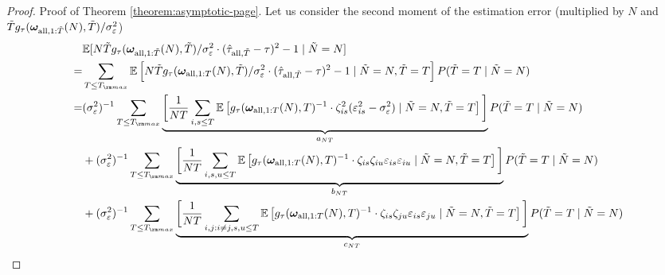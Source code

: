 \begin{proof}{Proof of Theorem \ref{theorem:asymptotic-page}.}
Let us consider the second moment of the estimation error (multiplied by $N$ and $\tilde{T}g_\tau(\bm{\omega}_{\mathrm{all},1:\tilde{T}}(N),\tilde{T})/\sigma_\varepsilon^2$)
\begin{align*}
     & \+E[N \tilde{T}\funfrac(\bm{\omega}_{\all,1:\tilde{T}}(N),\tilde{T})/\sigma_\varepsilon^2 \cdot (\hat{\tau}_{\all,\tilde{T}} - \tau)^2 - 1\mid \tilde{N}= N] \\
     =& \sum_{T \leq T_{\rm max}} \+E\left[ N \tilde{T}\funfrac(\bm{\omega}_{\all,1:T}(N),\tilde{T})/\sigma_\varepsilon^2 \cdot (\hat{\tau}_{\all,\tilde{T}} - \tau)^2  - 1\mid \tilde{N} = N, \tilde{T} = T \right] P(\tilde{T} = T \mid \tilde{N} = N)\\
     =& (\sigma_\varepsilon^2)^{-1} \sum_{T \leq T_{\rm max}} \underbrace{\bigg[ \frac{1}{NT}  \sum_{i,s \leq T} \+E\left[ \funfrac(\bm{\omega}_{\all,1:T}(N),{T})^\I \cdot \zeta_{is}^2 (\varepsilon_{is}^2 - \sigma_\varepsilon^2) \mid \tilde{N} = N, \tilde{T} = T \right] \bigg] }_{a_{NT}} P(\tilde{T} = T \mid \tilde{N} = N)\\
     & + (\sigma_\varepsilon^2)^{-1} \sum_{T \leq T_{\rm max}} \underbrace{\bigg[ \frac{1}{NT} \sum_{i,s,u\leq T} \+E\left[ \funfrac(\bm{\omega}_{\all,1:T}(N),{T})^\I \cdot \zeta_{is} \zeta_{iu}  \varepsilon_{is} \varepsilon_{iu} \mid \tilde{N} = N, \tilde{T} = T \right] \bigg] }_{b_{NT}} P(\tilde{T} = T \mid \tilde{N} = N)\\
     & + (\sigma_\varepsilon^2)^{-1} \sum_{T \leq T_{\rm max}} \underbrace{\bigg[ \frac{1}{NT} \sum_{i,j: i \neq j,s,u\leq T} \+E\left[ \funfrac(\bm{\omega}_{\all,1:T}(N),{T})^\I \cdot \zeta_{is} \zeta_{ju} \varepsilon_{is} \varepsilon_{ju} \mid \tilde{N} = N, \tilde{T} = T \right] \bigg] }_{c_{NT}}  P(\tilde{T} = T \mid \tilde{N} = N)
\end{align*}


\end{proof}
